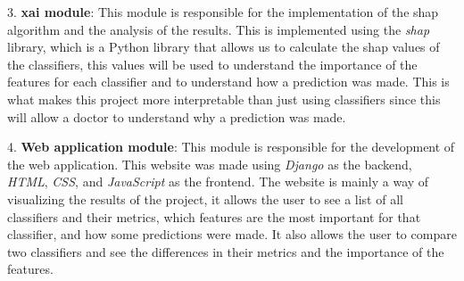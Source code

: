 3. \textbf{\ac{xai} module}: This module is responsible for the implementation of the \ac{shap} algorithm and the analysis of the results. This is implemented using the \textit{shap} library, which is a Python library that allows us to calculate the \ac{shap} values of the classifiers, this values will be used to understand the importance of the features for each classifier and to understand how a prediction was made. This is what makes this project more interpretable than just using classifiers since this will allow a doctor to understand why a prediction was made.

4. \textbf{Web application module}: This module is responsible for the development of the web application. This website was made using \textit{Django} as the backend, \textit{HTML}, \textit{CSS}, and \textit{JavaScript} as the frontend. The website is mainly a way of visualizing the results of the project, it allows the user to see a list of all classifiers and their metrics, which features are the most important for that classifier, and how some predictions were made. It also allows the user to compare two classifiers and see the differences in their metrics and the importance of the features.
